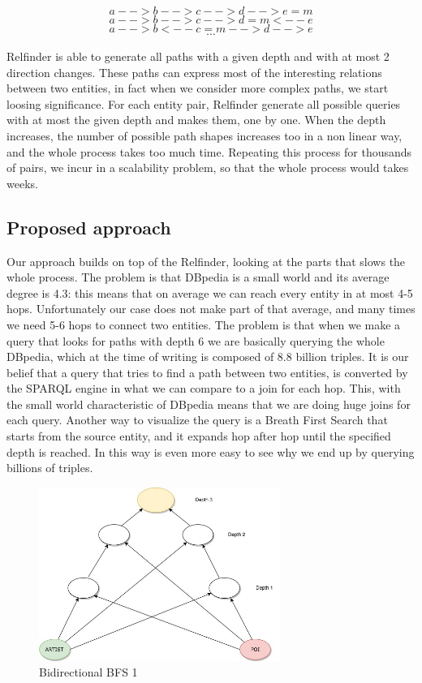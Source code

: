 \documentclass[paper=a4, fontsize=11pt]{scrartcl}
\begin{document}
$$a-->b-->c-->d-->e=m$$
$$a-->b-->c-->d=m<--e$$
$$a-->b<--c=m-->d-->e$$
$$\cdots$$

Relfinder is able to generate all paths with a given depth and with at most 2 direction changes.
These paths can express most of the interesting relations between two entities, in fact when we consider more complex paths, we start loosing significance.
For each entity pair, Relfinder generate all possible queries with at most the given depth and makes them, one by one.
When the depth increases, the number of possible path shapes increases too in a non linear way, and the whole process takes too much time. Repeating this process for thousands of pairs, we incur in a scalability problem, so that the whole process would takes weeks.

\subsection{Proposed approach}
Our approach builds on top of the Relfinder, looking at the parts that slows the whole process.
The problem is that DBpedia is a small world and its average degree is 4.3: this means that on average we can reach every entity in at most 4-5 hops. Unfortunately our case does not make part of that average, and many times we need 5-6 hops to connect two entities. The problem is that when we make a query that looks for paths with depth 6 we are basically querying the whole DBpedia, which at the time of writing is composed of 8.8 billion triples.
It is our belief that a query that tries to find a path between two entities, is converted by the SPARQL engine in what we can compare to a join for each hop. This, with the small world characteristic of DBpedia means that we are doing huge joins for each query.
Another way to visualize the query is a Breath First Search that starts from the source entity, and it expands hop after hop until the specified depth is reached. In this way is even more easy to see why we end up by querying billions of triples.

\begin{figure}[!htb]
  \centering
    \includegraphics[width=0.7\textwidth]{images/Path_Discovering.jpg}
    \caption{Bidirectional BFS 1}
\end{figure}
\end{document}
